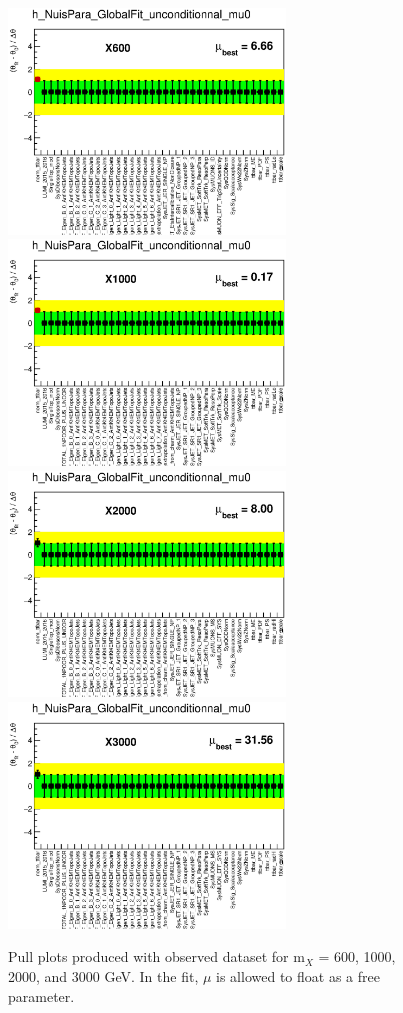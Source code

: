 \begin{figure}[hb]
\begin{center}
  \includegraphics[height=60mm]{figures/statFit_appendix/pullPlot_X600_globalFit_mu0_unconditional.eps} 
  \includegraphics[height=60mm]{figures/statFit_appendix/pullPlot_X1000_globalFit_mu0_unconditional.eps}
  \includegraphics[height=60mm]{figures/statFit_appendix/pullPlot_X2000_globalFit_mu0_unconditional.eps}
  \includegraphics[height=60mm]{figures/statFit_appendix/pullPlot_X3000_globalFit_mu0_unconditional.eps}
  \caption{Pull plots produced with observed dataset  for m$_X$ = 600, 1000, 2000, and 3000 GeV. In the fit, $\mu$ is allowed to float as a free parameter.}
  \label{fig:pullPlots_mu_uncond_obs}
\end{center}    
\end{figure}

